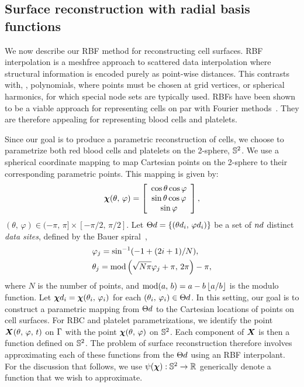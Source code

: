\subsection{Surface reconstruction with radial basis functions}\label{sec:rbf-interpolation}

We now describe our RBF method for reconstructing cell surfaces. RBF interpolation is a meshfree approach to scattered data interpolation
where structural information is encoded purely as point-wise distances. This
contrasts with, , polynomials, where points must be chosen at grid vertices, or spherical harmonics, for which special node sets are typically used. RBFs have been shown to be a viable approach for representing cells on par with Fourier methods~\cite{Shankar:2013ki}. They are therefore appealing for representing blood cells and platelets. 

Since our goal is to produce a parametric reconstruction of cells, we choose to parametrize both red blood cells and platelets on the 2-sphere, $\mathbb{S}^2$. We use a spherical coordinate mapping to map Cartesian points on the 2-sphere to their corresponding parametric points. This mapping is given by:
\begin{equation*}
    \boldsymbol{\chi}(\theta,\,\varphi) =
    \left[\begin{array}{c}
        \cos\theta\cos\varphi \\
        \sin\theta\cos\varphi \\
        \sin\varphi
    \end{array}\right],
\end{equation*}
$(\theta,\,\varphi)\in(-\pi,\,\pi]\times[-\pi/2,\,\pi/2]$.
Let $\data\sites = \{(\data\theta_i,\,\data\varphi_i)\}$ be a set of $\data\cardinality$
distinct \emph{data sites}, defined by the Bauer spiral~\cite{Bauer:2000km},
\begin{equation}\label{eq:bauer-spiral}
    \begin{aligned}
        &\varphi_j = \sin^{-1}(-1 + (2i + 1) / N), \\
        &\theta_j = \operatorname{mod}\left(\sqrt{N\pi}\varphi_j + \pi,\,2\pi\right) - \pi,
    \end{aligned}
\end{equation}
where $N$ is the number of points, and $\operatorname{mod}(a,\,b) = a - b\left\lfloor{a/b}\right\rfloor$ is the modulo
function. Let $\data\Xp_i = \Xp(\theta_i,\,\varphi_i)$ for each
$(\theta_i,\,\varphi_i) \in \data\sites$. In this setting, our goal is to construct a parametric mapping from $\data\sites$ to the Cartesian locations of points on cell surfaces. For RBC and platelet parametrizations, we identify the point $\boldsymbol{X}(\theta,\,\varphi,\,t)$
on $\Gamma$ with the point $\boldsymbol{\chi}(\theta,\,\varphi)$ on $\mathbb{S}^2$. Each component of
$\boldsymbol{X}$ is then a function defined on $\mathbb{S}^2$. The problem of surface reconstruction therefore involves approximating each of these functions from the $\data\sites$ using an RBF interpolant. For the discussion that follows, we use $\psi(\boldsymbol{\chi}) : \mathbb{S}^2 \to \mathbb{R}$ generically denote a function that we wish to approximate.

